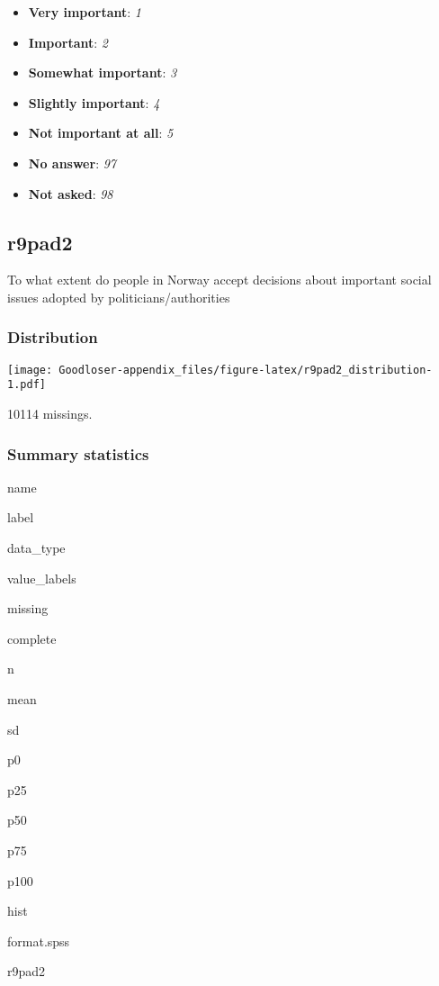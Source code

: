 \documentclass[]{book}
\providecommand{\tightlist}{%
  \setlength{\itemsep}{0pt}\setlength{\parskip}{0pt}}
\begin{document}
\begin{itemize}
\tightlist
\item
  \textbf{Very important}: \emph{1}
\item
  \textbf{Important}: \emph{2}
\item
  \textbf{Somewhat important}: \emph{3}
\item
  \textbf{Slightly important}: \emph{4}
\item
  \textbf{Not important at all}: \emph{5}
\item
  \textbf{No answer}: \emph{97}
\item
  \textbf{Not asked}: \emph{98}
\end{itemize}

\subsection{r9pad2}\label{r9pad2}

To what extent do people in Norway accept decisions about important
social issues adopted by politicians/authorities

\subsubsection{Distribution}\label{r9pad2_distribution}

\texttt{[image: Goodloser-appendix\_files/figure-latex/r9pad2\_distribution-1.pdf]}

10114 missings.

\subsubsection{Summary statistics}\label{r9pad2_summary}

name

label

data\_type

value\_labels

missing

complete

n

mean

sd

p0

p25

p50

p75

p100

hist

format.spss

r9pad2
\end{document}
